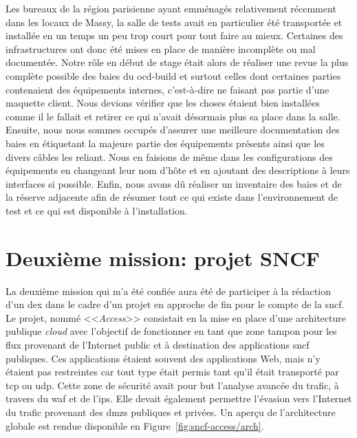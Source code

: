 \documentclass[12pt, oneside, a4paper, titlepage]{report}
\begin{document}
Les bureaux de la région parisienne ayant emménagés relativement récemment dans
les locaux de Massy, la salle de tests avait en particulier été transportée et
installée en un temps un peu trop court pour tout faire au mieux. Certaines des
infrastructures ont donc été mises en place de manière incomplète ou mal
documentée. Notre rôle en début de stage était alors de réaliser une revue la
plus complète possible des baies du \gls{ocd-build} et surtout celles dont
certaines parties contenaient des équipements internes, c'est-à-dire ne faisant
pas partie d'une maquette client. Nous devions vérifier que les choses étaient
bien installées comme il le fallait et retirer ce qui n'avait désormais plus sa
place dans la salle. Ensuite, nous nous sommes occupés d'assurer une meilleure
documentation des baies en étiquetant la majeure partie des équipements présents
ainsi que les divers câbles les reliant. Nous en faisions de même dans les
configurations des équipements en changeant leur nom d'hôte et en ajoutant des
descriptions à leurs interfaces si possible. Enfin, nous avons dû réaliser un
inventaire des baies et de la réserve adjacente afin de résumer tout ce qui
existe dans l'environnement de test et ce qui est disponible à l'installation.


\section{Deuxième mission: projet SNCF}%
\label{sec:mission::deuz}

La deuxième mission qui m'a été confiée aura été de participer à la rédaction
d'un \acrfull{dex} dans le cadre d'un projet en approche de fin pour le compte
de la \gls{sncf}. Le projet, nommé <<\textit{Access}>> consistait en la mise en
place d'une architecture publique \textit{cloud} avec l'objectif de fonctionner
en tant que zone tampon pour les flux provenant de l'Internet public et à
destination des applications \gls{sncf} publiques. Ces applications étaient
souvent des applications Web, mais n'y étaient pas restreintes car tout type
était permis tant qu'il était transporté par \gls{tcp} ou \gls{udp}. Cette zone
de sécurité avait pour but l'analyse avancée du trafic, à travers du \gls{waf}
et de l'\gls{ips}.  Elle devait également permettre l'évasion vers l'Internet du
trafic provenant des \glspl{dmz} publiques et privées. Un aperçu de
l'architecture globale est rendue disponible en
Figure~\ref{fig:sncf-access/arch}.
\end{document}
